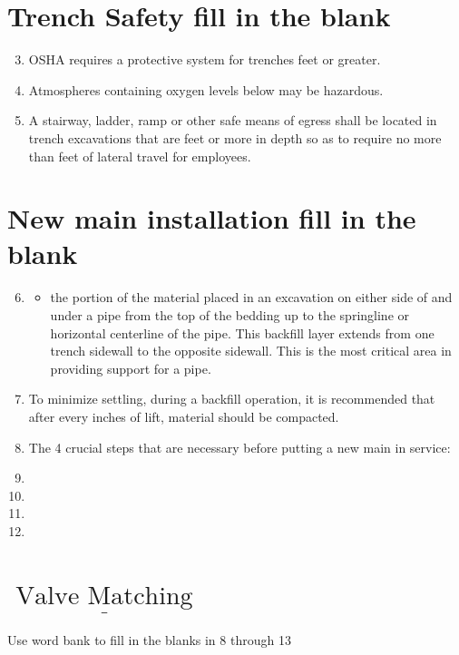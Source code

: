 \documentclass[10pt]{article}
\begin{document}
\section{Trench Safety fill in the blank}
\begin{enumerate}
  \setcounter{enumi}{2}
  \item OSHA requires a protective system for trenches feet or greater.

  \item Atmospheres containing oxygen levels below may be hazardous.

  \item A stairway, ladder, ramp or other safe means of egress shall be located in trench excavations that are feet or more in depth so as to require no more than feet of lateral travel for employees.

\end{enumerate}
\section{New main installation fill in the blank}
\begin{enumerate}
  \setcounter{enumi}{5}
  \item 
  \begin{itemize}
    \item the portion of the material placed in an excavation on either side of and under a pipe from the top of the bedding up to the springline or horizontal centerline of the pipe. This backfill layer extends from one trench sidewall to the opposite sidewall. This is the most critical area in providing support for a pipe.
  \end{itemize}
  \item To minimize settling, during a backfill operation, it is recommended that after every inches of lift, material should be compacted.

  \item The 4 crucial steps that are necessary before putting a new main in service:

  \item 
  \item 
  \item 
  \item 
\end{enumerate}
\section{$\underline{\text { Valve Matching }}$}
Use word bank to fill in the blanks in 8 through 13
\end{document}
